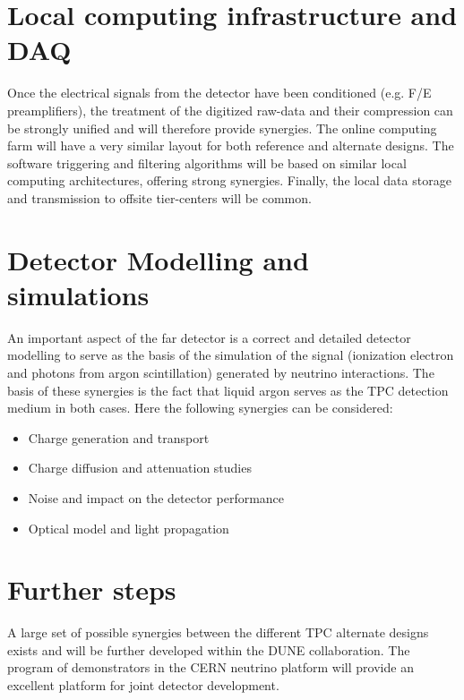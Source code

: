 \section{Local computing infrastructure and DAQ}
Once the electrical signals from the detector have been conditioned
(e.g. F/E preamplifiers), the treatment of the digitized raw-data and
their compression can be strongly unified and will therefore provide
synergies. The online computing farm will have a very similar layout
for both reference and alternate designs. The software triggering and
filtering algorithms will be based on similar local computing
architectures, offering strong synergies. Finally, the local data
storage and transmission to offsite tier-centers will be common.

\section{Detector Modelling and simulations}

An important aspect of the far detector is a correct and detailed
detector modelling to serve as the basis of the simulation of the
signal (ionization electron and photons from argon scintillation)
generated by neutrino interactions. The basis of these synergies is
the fact that liquid argon serves as the TPC detection medium in both
cases. Here the following synergies can be considered:

\begin{itemize}
\item Charge generation and transport
\item Charge diffusion and attenuation studies
\item Noise and impact on the detector performance
\item Optical model and light propagation
\end{itemize}

\section{Further steps}

A large set of possible synergies between the different TPC alternate
designs exists and will be further developed within the DUNE
collaboration.  The program of demonstrators in the CERN neutrino
platform will provide an excellent platform for joint detector
development.

